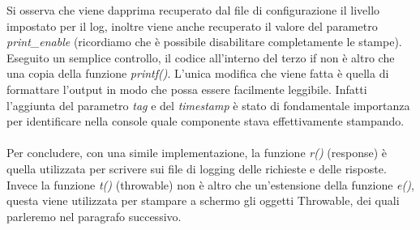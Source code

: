 \documentclass[italian]{tktltiki2}
\begin{document}
Si osserva che viene dapprima recuperato dal file di configurazione il livello impostato per il log, inoltre viene anche recuperato il valore del parametro \emph{print\_enable} (ricordiamo che è possibile disabilitare completamente le stampe). Eseguito un semplice controllo, il codice all'interno del terzo if non è altro che una copia della funzione \emph{printf()}. L'unica modifica che viene fatta è quella di formattare l'output in modo che possa essere facilmente leggibile. Infatti l'aggiunta del parametro \emph{tag} e del \emph{timestamp} è stato di fondamentale importanza per identificare nella console quale componente stava effettivamente stampando.
\\
\\
Per concludere, con una simile implementazione, la funzione \emph{r()} (response) è quella utilizzata per scrivere sui file di logging delle richieste e delle risposte. Invece la funzione \emph{t()} (throwable) non è altro che un'estensione della funzione \emph{e()}, questa viene utilizzata per stampare a schermo gli oggetti Throwable, dei quali parleremo nel paragrafo successivo.
\end{document}
